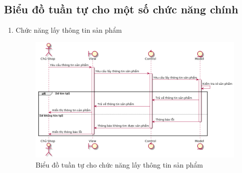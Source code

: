 \subsection{Biểu đồ tuần tự cho một số chức năng chính}
\begin{enumerate}[label=\textbf{\alph*)}]
	\item Chức năng lấy thông tin sản phẩm
	      \begin{figure}[h!]
		      \includegraphics[scale=0.5]{fig/s_get_product_info.png}
		      \caption{Biểu đồ tuần tự cho chức năng lấy thông tin sản phẩm}
	      \end{figure}


\end{enumerate}
